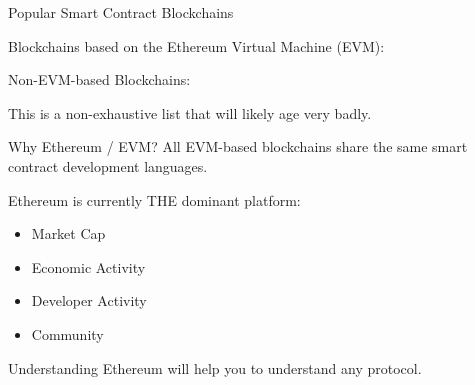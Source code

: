 \documentclass[handout]{beamer}
\begin{document}
\begin{frame}{Popular Smart Contract Blockchains}

Blockchains based on the Ethereum Virtual Machine (EVM):

\vspace{0.2em}

\begin{center}
\begin{tikzpicture}[scale=1, every node/.style={scale=1}]
	
\end{tikzpicture}
\end{center}

\vspace{1em}



Non-EVM-based Blockchains:

\vspace{0.2em}

\begin{center}
\begin{tikzpicture}[scale=1, every node/.style={scale=1}]
	
\end{tikzpicture}
\end{center}

\vspace{1em}
This is a non-exhaustive list that will likely age very badly.

\end{frame}

\begin{frame}{Why Ethereum / EVM?}
	All EVM-based blockchains share the same smart contract development languages.
	
	\vspace{1 em}
	
	Ethereum is currently THE dominant platform:
	\begin{itemize}
		\item Market Cap
		\item Economic Activity
		\item Developer Activity
		\item Community
	\end{itemize}
	\vspace{1 em}
	Understanding Ethereum will help you to understand any protocol.
\end{frame}

\end{document}
